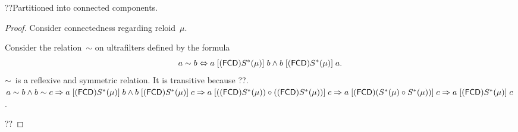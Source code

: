 \begin{thm}
??Partitioned into connected components.
\end{thm}

\begin{proof}

Consider connectedness regarding reloid~$\mu$.

Consider the relation~$\sim$ on ultrafilters defined by the formula
\[ a\sim b\Leftrightarrow a\mathrel{\left[(\mathsf{FCD}) S^\ast(\mu)\right]}b \land
b\mathrel{\left[(\mathsf{FCD}) S^\ast(\mu)\right]}a. \]
$\sim$~is a reflexive and symmetric relation.
It is transitive because ??.
$a\sim b\land b\sim c \Rightarrow
a\mathrel{\left[(\mathsf{FCD}) S^\ast(\mu)\right]}b \land b\mathrel{\left[(\mathsf{FCD}) S^\ast(\mu)\right]}c
\Rightarrow
a\mathrel{\left[((\mathsf{FCD}) S^\ast(\mu))\circ((\mathsf{FCD}) S^\ast(\mu))\right]}c
\Rightarrow
a\mathrel{\left[(\mathsf{FCD})(S^\ast(\mu)\circ S^\ast(\mu))\right]}c
\Rightarrow
a\mathrel{\left[(\mathsf{FCD}) S^\ast(\mu)\right]}c$.

??
\end{proof}


